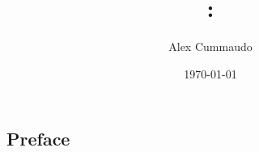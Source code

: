 \documentclass[twoside,11pt,titlepage,table]{book}
\title{\thesubtitle: \themaintitle}
\author{Alex Cummaudo}
\date{\today}
\def\review{}
\begin{document}
\frontmatter

% 
% 
% 
% 
% 

\mainmatter

\ifdefined\review\begin{linenumbers}\else\fi

\part{Preface}\label{part:preface}
\cleardoublepage
\cleardoublepage
\cleardoublepage




\ifdefined\review\end{linenumbers}\else\fi

\appendix

% 
% 
% 
% 
\end{document}
